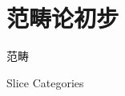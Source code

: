 \chapter{范畴论初步}

\begin{definition}{范畴}
	
\end{definition}


\begin{example} %
	Slice Categories
\end{example}



